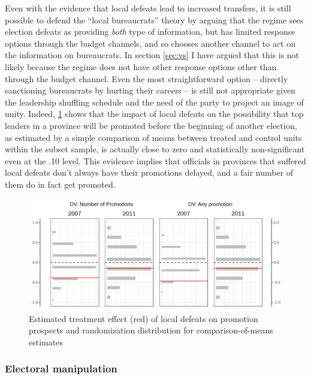 \documentclass[12pt]{article}\usepackage[]{graphicx}\usepackage[]{color}
\newcommand{\1}{\mathbbm{1}}
\begin{document}
Even with the evidence that local defeats lead to increased transfers, it is still possible to defend the ``local bureaucrats'' theory by arguing that the regime sees election defeats as providing \textit{both} type of information, but has limited response options through the budget channels, and so chooses another channel to act on the information on bureaucrats. In section \ref{sec:vs} I have argued that this is not likely because the regime does not have other response options other than through the budget channel. Even the most straightforward option -- directly sanctioning bureaucrats by hurting their careers -- is still not appropriate given the leadership shuffling schedule and the need of the party to project an image of unity. Indeed, \ref{fig:Lead} shows that the impact of local defeats on the possibility that top leaders in a province will be promoted before the beginning of another election, as estimated by a simple comparison of means between treated and control units within the subset sample, is actually close to zero and statistically non-significant even at the .10 level. This evidence implies that officials in provinces that suffered local defeats don't always have their promotions delayed, and a fair number of them do in fact get promoted.

\begin{figure}[!htbp]
	\centering
	\includegraphics[width=\textwidth]{figure/SYP_RI_LEAD.png}
	\captionsetup{singlelinecheck=off}
	\caption[Estimated effects of on promotion]{Estimated treatment effect (red) of local defeats on promotion prospects and randomization distribution for comparison-of-means estimates }
	\label{fig:Lead}
\end{figure}

\subsubsection{Electoral manipulation}
\end{document}
